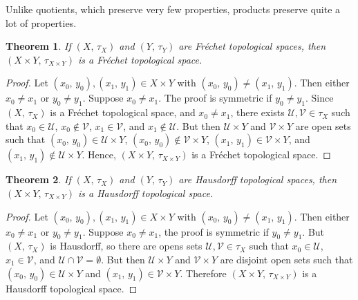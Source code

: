 \documentclass{article}
\theoremstyle{plain}
\newtheorem{theorem}{Theorem}[section]
\theoremstyle{normal}
\begin{document}
        Unlike quotients, which preserve very few properties, products preserve
        quite a lot of properties.
        \begin{theorem}
            If $(X,\,\tau_{X})$ and $(Y,\,\tau_{Y})$ are
            Fr\'{e}chet topological spaces, then
            $(X\times{Y},\,\tau_{X\times{Y}})$ is a Fr\'{e}chet topological
            space.
        \end{theorem}
        \begin{proof}
            Let $(x_{0},\,y_{0}),(x_{1},\,y_{1})\in{X}\times{Y}$ with
            $(x_{0},\,y_{0})\ne(x_{1},\,y_{1})$. Then either
            $x_{0}\ne{x}_{1}$ or $y_{0}\ne{y}_{1}$. Suppose $x_{0}\ne{x}_{1}$.
            The proof is symmetric if $y_{0}\ne{y}_{1}$. Since
            $(X,\,\tau_{X})$ is a Fr\'{e}chet topological space, and
            $x_{0}\ne{x}_{1}$, there exists $\mathcal{U},\mathcal{V}\in\tau_{X}$
            such that $x_{0}\in\mathcal{U}$, $x_{0}\notin\mathcal{V}$,
            $x_{1}\in\mathcal{V}$, and $x_{1}\notin\mathcal{U}$. But then
            $\mathcal{U}\times{Y}$ and $\mathcal{V}\times{Y}$
            are open sets such that
            $(x_{0},\,y_{0})\in\mathcal{U}\times{Y}$,
            $(x_{0},\,y_{0})\notin\mathcal{V}\times{Y}$,
            $(x_{1},\,y_{1})\in\mathcal{V}\times{Y}$, and
            $(x_{1},\,y_{1})\notin\mathcal{U}\times{Y}$. Hence,
            $(X\times{Y},\,\tau_{X\times{Y}})$ is a Fr\'{e}chet topological
            space.
        \end{proof}
        \begin{theorem}
            If $(X,\,\tau_{X})$ and $(Y,\,\tau_{Y})$ are Hausdorff topological
            spaces, then $(X\times{Y},\,\tau_{X\times{Y}})$ is a Hausdorff
            topological space.
        \end{theorem}
        \begin{proof}
            Let $(x_{0},\,y_{0}),(x_{1},\,y_{1})\in{X}\times{Y}$ with
            $(x_{0},\,y_{0})\ne(x_{1},\,y_{1})$. Then either
            $x_{0}\ne{x}_{1}$ or $y_{0}\ne{y}_{1}$. Suppose
            $x_{0}\ne{x}_{1}$, the proof is symmetric if
            $y_{0}\ne{y}_{1}$. But $(X,\,\tau_{X})$ is Hausdorff, so there are
            opens sets $\mathcal{U},\mathcal{V}\in\tau_{X}$ such that
            $x_{0}\in\mathcal{U}$, $x_{1}\in\mathcal{V}$, and
            $\mathcal{U}\cap\mathcal{V}=\emptyset$. But then
            $\mathcal{U}\times{Y}$ and $\mathcal{V}\times{Y}$ are disjoint open
            sets such that $(x_{0},\,y_{0})\in\mathcal{U}\times{Y}$ and
            $(x_{1},\,y_{1})\in\mathcal{V}\times{Y}$. Therefore
            $(X\times{Y},\,\tau_{X\times{Y}})$ is a Hausdorff topological space.
        \end{proof}
\end{document}
